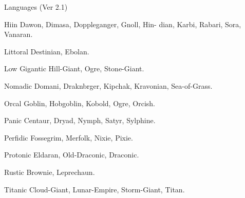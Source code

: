 \begin{Chapter}{Languages (Ver 2.1)}
\begin{Description}
\item[Hiin]  Dawon,  Dimasa,  Doppleganger,  Gnoll,  Hin-
dian, Karbi, Rabari, Sora, Vanaran. 

\item[Littoral] Destinian, Ebolan. 

\item[Low] Gigantic Hill-Giant, Ogre, Stone-Giant. 

\item[Nomadic] Domani, Draknbrger, Kipchak, Kravonian, Sea-of-Grass.

\item[Orcal] Goblin, Hobgoblin, Kobold, Ogre, Orcish.  

\item[Panic] Centaur, Dryad, Nymph, Satyr, Sylphine.  

\item[Perfidic] Fossegrim, Merfolk, Nixie, Pixie.  

\item[Protonic] Eldaran, Old-Draconic, Draconic.  

\item[Rustic] Brownie, Leprechaun. 

\item[Titanic]  Cloud-Giant,  Lunar-Empire,  Storm-Giant, 
Titan. 

\end{Description}

\end{Chapter}
